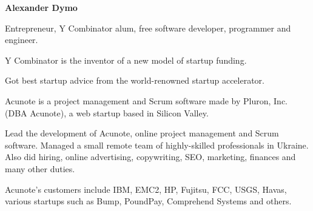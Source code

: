 \documentclass[12pt]{letter}
\begin{document}
{\large\centering\textbf{Alexander Dymo}\\}

\address
{
  \texttt{alex@alexdymo.com} \\
  +380\,67\,512\,28\,01 \\
  Mykolayiv, Ukraine \\
}


\begin{llist}

  \vspace{.30in}                %


             Entrepreneur, Y Combinator alum, free software developer,
             programmer and engineer.



  \startexperience

           \item Y Combinator is the inventor of a new model of startup funding.

           \item Got best startup advice from the world-renowned startup accelerator.

  \endexperience


  \startexperience

           \item Acunote is a project management and Scrum software made by Pluron, Inc.
           (DBA Acunote), a web startup based in Silicon Valley.

           \item Lead the development of Acunote, online project management
           and Scrum software. Managed a small remote team of highly-skilled
           professionals in Ukraine. Also did hiring, online advertising,
           copywriting, SEO, marketing, finances and many other duties.

           \item Acunote's customers include IBM, EMC2, HP, Fujitsu, FCC, USGS, Havas,
           various startups such as Bump, PoundPay, Comprehend Systems and others.


\end{llist}
\end{document}
